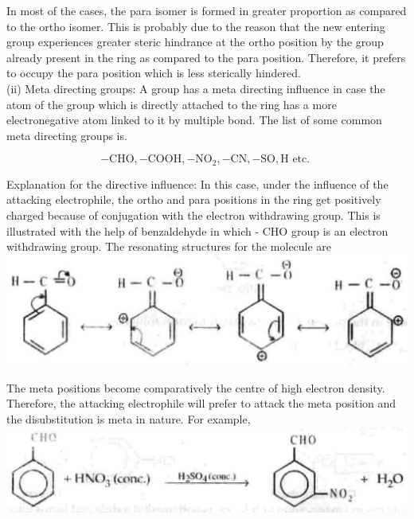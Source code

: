 \documentclass[10pt]{article}
\begin{document}
In most of the cases, the para isomer is formed in greater proportion as compared to the ortho isomer. This is probably due to the reason that the new entering group experiences greater steric hindrance at the ortho position by the group already present in the ring as compared to the para position. Therefore, it prefers to occupy the para position which is less sterically hindered.\\
(ii) Meta directing groups: A group has a meta directing influence in case the atom of the group which is directly attached to the ring has a more electronegative atom linked to it by multiple bond. The list of some common meta directing groups is.

$$
-\mathrm{CHO},-\mathrm{COOH},-\mathrm{NO}_{2},-\mathrm{CN},-\mathrm{SO}, \mathrm{H} \text { etc. }
$$

Explanation for the directive influence: In this case, under the influence of the attacking electrophile, the ortho and para positions in the ring get positively charged because of conjugation with the electron withdrawing group. This is illustrated with the help of benzaldehyde in which - CHO group is an electron withdrawing group. The resonating structures for the molecule are\\
\includegraphics[max width=\textwidth, center]{2025_01_28_8470952b98110cec3aabg-213(1)}

The meta positions become comparatively the centre of high electron density. Therefore, the attacking electrophile will prefer to attack the meta position and the disubstitution is meta in nature. For example,\\
\includegraphics[max width=\textwidth, center]{2025_01_28_8470952b98110cec3aabg-213}
\end{document}
